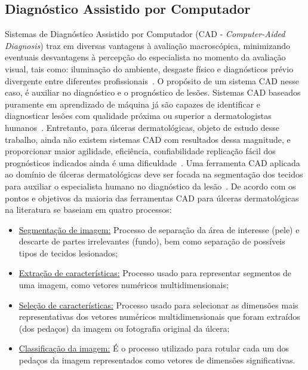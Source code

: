 \subsection{Diagnóstico Assistido por Computador}

Sistemas de Diagnóstico Assistido por Computador (CAD - \textit{Computer-Aided Diagnosis}) traz em diversas vantagens à avaliação macroscópica, minimizando eventuais desvantagens à percepção do especialista no momento da avaliação visual, tais como: iluminação do ambiente, desgaste físico e diagnósticos prévio divergente entre diferentes profissionais~\cite{Maglogiannis2005}. 
O propósito de um sistema CAD nesse caso, é auxiliar no diagnóstico e o prognóstico de lesões.
Sistemas CAD baseados puramente em aprendizado de máquina já são capazes de identificar e diagnosticar lesões com qualidade próxima ou superior a dermatologistas humanos~\cite{Esteva2017}.
Entretanto, para úlceras dermatológicas, objeto de estudo desse trabalho, ainda não existem sistemas CAD com resultados dessa magnitude, e proporcionar maior agilidade, eficiência, confiabilidade replicação fácil dos prognósticos indicados ainda é uma dificuldade~\cite{Blanco2016,Kavitha2017,Chino2018}.
Uma ferramenta CAD aplicada ao domínio de úlceras dermatológicas deve ser focada na segmentação dos tecidos para auxiliar o especialista humano no diagnóstico da lesão~\cite{Oduncu2004,Pereyra2014}. 
De acordo com  os pontos e objetivos da maioria das ferramentas CAD para úlceras dermatológicas na literatura se baseiam em quatro processos:

\begin{itemize}
    
    \item \underline{Segmentação de imagem:} Processo de separação da área de interesse (pele) e descarte de partes irrelevantes (fundo), bem como separação de possíveis tipos de tecidos lesionados;
    
    \item \underline{Extração de características:} Processo usado para representar segmentos de uma imagem, como vetores numéricos multidimensionais;
    
    \item \underline{Seleção de características:} Processo usado para selecionar as dimensões mais representativas dos vetores numéricos multidimensionais que foram extraídos (dos pedaços) da imagem ou fotografia original da úlcera; 
    
    \item \underline{Classificação da imagem:} É o processo utilizado para rotular cada um dos pedaços da imagem representados como vetores de dimensões significativas.
\end{itemize}

